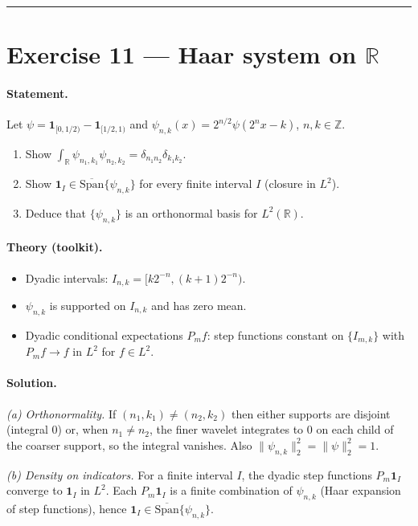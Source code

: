 \documentclass[12pt,a4paper]{article}
\theoremstyle{plain}
\theoremstyle{definition}
\theoremstyle{remark}
\theoremstyle{remark}
\theoremstyle{definition}
\begin{document}
\bigskip\hrule\bigskip

\section*{Exercise 11 — Haar system on $\mathbb{R}$}

\paragraph{Statement.}
Let $\psi=\mathbf 1_{[0,1/2)}-\mathbf 1_{[1/2,1)}$ and $\psi_{n,k}(x)=2^{n/2}\psi(2^n x-k)$, $n,k\in\mathbb{Z}$.
\begin{enumerate}\itemsep2pt
	\item[(a)] Show $\displaystyle \int_{\mathbb{R}}\psi_{n_1,k_1}\psi_{n_2,k_2}=\delta_{n_1n_2}\delta_{k_1k_2}$.
	\item[(b)] Show $\mathbf 1_I\in\overline{\mathrm{Span}}\{\psi_{n,k}\}$ for every finite interval $I$ (closure in $L^2$).
	\item[(c)] Deduce that $\{\psi_{n,k}\}$ is an orthonormal basis for $L^2(\mathbb{R})$.
\end{enumerate}

\paragraph{Theory (toolkit).}
\begin{itemize}\itemsep3pt
	\item Dyadic intervals: $I_{n,k}=[k2^{-n},(k+1)2^{-n})$.
	\item $\psi_{n,k}$ is supported on $I_{n,k}$ and has zero mean.
	\item Dyadic conditional expectations $P_m f$: step functions constant on $\{I_{m,k}\}$ with $P_m f\to f$ in $L^2$ for $f\in L^2$.
\end{itemize}

\paragraph{Solution.}
\emph{(a) Orthonormality.} If $(n_1,k_1)\neq(n_2,k_2)$ then either supports are disjoint (integral $0$) or,
when $n_1\neq n_2$, the finer wavelet integrates to $0$ on each child of the coarser support, so the integral vanishes.
Also $\|\psi_{n,k}\|_2^2=\|\psi\|_2^2=1$.

\smallskip
\emph{(b) Density on indicators.} For a finite interval $I$, the dyadic step functions $P_m\mathbf 1_I$ converge to
$\mathbf 1_I$ in $L^2$. Each $P_m\mathbf 1_I$ is a finite combination of $\psi_{n,k}$ (Haar expansion of step functions),
hence $\mathbf 1_I\in\overline{\mathrm{Span}}\{\psi_{n,k}\}$.
\end{document}
